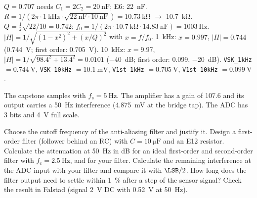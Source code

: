 \begin{solution}
\begin{talist}
\ta $Q = 0.707$ needs $C_1 = 2C_2 = \SI{20}{\nano\farad}$; E6: \SI{22}{\nano\farad}.
    \newline $R = 1/(2\pi\cdot\SI{1}{\kilo\hertz}\cdot\sqrt{\SI{22}{\nano\farad}\cdot\SI{10}{\nano\farad}}) = \SI{10.73}{\kilo\ohm}$ $\rightarrow$ \SI{10.7}{\kilo\ohm}.
\ta $Q = \frac12\sqrt{22/10} = 0.742$; $f_0 = 1/(2\pi\cdot\SI{10.7}{\kilo\ohm}\cdot\SI{14.83}{\nano\farad}) = \SI{1003}{\hertz}$.
\ta $|H| = 1/\sqrt{(1-x^2)^2 + (x/Q)^2}$ with $x = f/f_0$.
    \SI{1}{\kilo\hertz}: $x = 0.997$, $|H| = 0.744$ (\SI{0.744}{\volt}; first order: \SI{0.705}{\volt}).
    \SI{10}{\kilo\hertz}: $x = 9.97$, $|H| = 1/\sqrt{98.4^2 + 13.4^2} = 0.0101$ (\SI{-40}{\deci\bel}; first order: 0.099, \SI{-20}{\deci\bel}).
\ta {}\newline \texttt{VSK\_1kHz} $= \SI{0.744}{\volt}$, \texttt{VSK\_10kHz} $= \SI{10.1}{\milli\volt}$,\newline
    \texttt{V1st\_1kHz} $= \SI{0.705}{\volt}$, \texttt{V1st\_10kHz} $= \SI{0.099}{\volt}$.
\end{talist}
\end{solution}

\label{ex:filt-aa}
The capstone samples with $f_s = \SI{5}{\hertz}$. The amplifier has a gain of 107.6
and its output carries a \SI{50}{\hertz} interference (\SI{4.875}{\milli\volt} at the bridge tap).
The ADC has 3 bits and \SI{4}{\volt} full scale.
\begin{talist}
\ta Choose the cutoff frequency of the anti-aliasing filter and justify it.
\ta Design a first-order filter (follower behind an RC) with $C = \SI{10}{\micro\farad}$ and an E12 resistor.
\ta Calculate the attenuation at \SI{50}{\hertz} in dB for an ideal first-order and second-order filter with $f_c = \SI{2.5}{\hertz}$, and for your filter.
\ta Calculate the remaining interference at the ADC input with your filter and compare it with $\LSB/2$.
\ta How long does the filter output need to settle within \SI{1}{\percent} after a step of the sensor signal?
\ta Check the result in Falstad (signal \SI{2}{\volt} DC with \SI{0.52}{\volt} at \SI{50}{\hertz}).
\end{talist}

